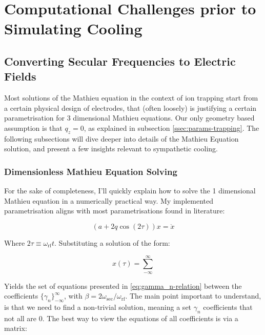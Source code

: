 \chapter{Computational Challenges prior to Simulating Cooling}

\section{Converting Secular Frequencies to Electric Fields}\label{sec:comp/freqs2aq}

Most solutions of the Mathieu equation in the context of ion trapping start from a certain physical design of electrodes, that (often loosely\cite{AkermanThesis}) is justifying a certain parametrisation for 3 dimensional Mathieu equations. Our only geometry based assumption is that $q_z = 0$, as explained in subsection \ref{ssec:params-trapping}. The following subsections will dive deeper into details of the Mathieu Equation solution, and present a few insights relevant to sympathetic cooling. 

\subsection{Dimensionless Mathieu Equation Solving}\label{ssec:comp/mathieu}

For the sake of completeness, I'll quickly explain how to solve the 1 dimensional Mathieu equation in a numerically practical way. My implemented parametrisation aligns with most parametrisations found in literature:

\begin{equation}
	(a + 2 q \cos(2 \tau)) x = \ddot{x}
	\label{eq:bare-mathieu}
\end{equation}

Where $2\tau \equiv \omega_\mathrm{rf} t$. Substituting a solution of the form:

$$x(\tau) = \sum_{-\infty}^\infty $$

Yields the set of equations presented in \ref{eq:gamma_n-relation} between the coefficients $\{\gamma_n\}_{-\infty}^\infty$, with $\beta = 2 \omega_\mathrm{sec}/\omega_\mathrm{rf}$. The main point important to understand, is that we need to find a non-trivial solution, meaning a set $\gamma_n$ coefficients that not all are $0$. The best way to view the equations of all coefficients is via a matrix:

